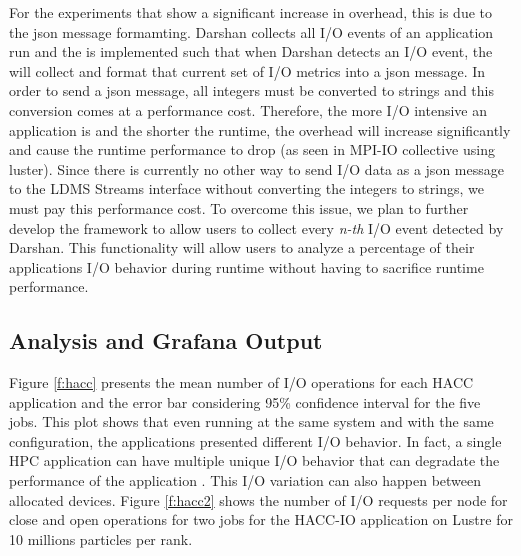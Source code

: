 For the experiments that show a significant increase in overhead, this is due to the json message formamting. Darshan collects all I/O events of an application run and the \connector{} is implemented such that when Darshan detects an I/O event, the \connector{} will collect and format that current set of I/O metrics into a json message. In order to send a json message, all integers must be converted to strings and this conversion comes at a performance cost. Therefore, the more I/O intensive an application is and the shorter the runtime, the overhead will increase significantly and cause the runtime performance to drop (as seen in MPI-IO collective using luster). Since there is currently no other way to send I/O data as a json message to the LDMS Streams interface without converting the integers to strings, we must pay this performance cost. To overcome this issue, we plan to further develop the \Darshan{} framework to allow users to collect every \emph{n-th} I/O event detected by Darshan. This functionality will allow users to analyze a percentage of their applications I/O behavior during runtime without having to sacrifice runtime performance.     


\subsection{Analysis and Grafana Output}
Figure \ref{f:hacc} presents the mean number of I/O operations for
each HACC application and the error bar considering 95\% confidence
interval for the five jobs. This plot shows that even running at the
same system and with the same configuration, the applications
presented different I/O behavior. In fact, a single HPC application
can have multiple unique I/O behavior that can degradate the
performance of the application \cite{costa2021}. This I/O variation
can also happen between allocated devices. Figure \ref{f:hacc2} shows
the number of I/O requests per node for close and open operations for
two jobs for the HACC-IO application on Lustre for 10 millions
particles per rank.

